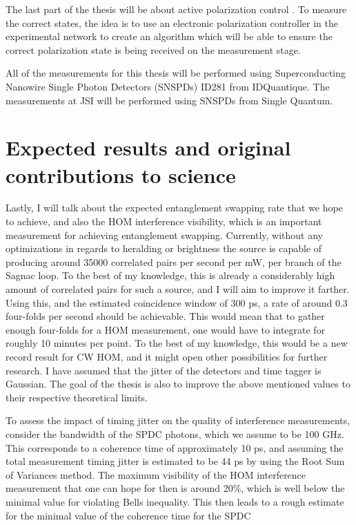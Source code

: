 \documentclass{article}
\begin{document}
The last part of the thesis will be about active polarization control
\cite{CCSHDCDRS}. To measure the correct states, the idea is to use an
electronic polarization controller in the experimental network to create an
algorithm which will be able to ensure the correct polarization state is being
received on the measurement stage.

All of the measurements for this thesis will be performed using Superconducting
Nanowire Single Photon Detectors (SNSPDs) ID281 from IDQuantique. The
measurements at JSI will be performed using SNSPDs from Single Quantum.


\section{Expected results and original contributions to science} Lastly, I will
talk about the expected entanglement swapping rate that we hope to achieve, and
also the HOM interference visibility, which is an important measurement for
achieving entanglement swapping. Currently, without any optimizations in
regards to heralding or brightness the source is capable of producing around
35000 correlated pairs per second per mW, per branch of the Sagnac loop. To the
best of my knowledge, this is already a considerably high amount of correlated
pairs for such a source, and I will aim to improve it farther. Using this, and
the estimated coincidence window of 300 ps, a rate of around 0.3 four-folds per
second should be achievable. This would mean that to gather enough four-folds
for a HOM measurement, one would have to integrate for roughly 10 minutes per
point. To the best of my knowledge, this would be a new record result for CW
HOM, and it might open other possibilities for further research. I have assumed
that the jitter of the detectors and time tagger is Gaussian. The goal of the
thesis is also to improve the above mentioned values to their respective
theoretical limits. \par To assess the impact of timing jitter on the quality
of interference measurements, consider the bandwidth of the SPDC photons, which
we assume to be 100 GHz. This corresponds to a coherence time of approximately
10 ps, and assuming the total measurement timing jitter is estimated to be 44
ps by using the Root Sum of Variances method. The maximum visibility of the HOM
interference measurement that one can hope for then is around 20\%, which is
well below the minimal value for violating Bells inequality. This then leads to
a rough estimate for the minimal value of the coherence time for the SPDC
\end{document}
